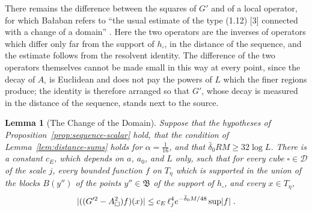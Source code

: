 \documentclass[11pt]{preprint}
\DeclarePairedDelimiter{\abs}{\lvert}{\rvert}
\numberwithin{equation}{section}
\newtheorem{lemma}[theorem]{Lemma}
\theoremstyle{definition}
\theoremstyle{remark}
\theoremstyle{plain}
\begin{document}
There remains the difference between the squares of $G'$ and of a local operator, for which Ba{\l}aban refers to ``the usual estimate of the type (1.12) [3] connected with a change of a domain'' \cite[p.~238]{BalabanPRT2}. Here the two operators are the inverses of operators which differ only far from the support of $h_\square$, in the distance of the sequence, and the estimate follows from the resolvent identity. The difference of the two operators themselves cannot be made small in this way at every point, since the decay of $A_\square$ is Euclidean and does not pay the powers of $L$ which the finer regions produce; the identity is therefore arranged so that $G'$, whose decay is measured in the distance of the sequence, stands next to the source.

\begin{lemma}[The Change of the Domain]\label{lem:change-of-domain}
Suppose that the hypotheses of Proposition~\ref{prop:sequence-scalar} hold, that the condition of Lemma~\ref{lem:distance-sums} holds for $\alpha = \frac{1}{16}$, and that $\bar\delta_0RM \geq 32\log L$. There is a constant $c_E$, which depends on $a$, $a_0$, and $L$ only, such that for every cube $\square \in \mathscr D$ of the scale $j$, every bounded function $f$ on $T_\eta$ which is supported in the union of the blocks $B(y'')$ of the points $y'' \in \mathfrak B$ of the support of $h_\square$, and every $x \in T_\eta$,
\begin{equation}\label{eq:change-of-domain}
    \abs{((G'^2 - A_\square^2)f)(x)} \leq c_E\,\ell_j^4e^{-\bar\delta_0M/48}\sup\abs f\;.
\end{equation}
\end{lemma}
\end{document}
